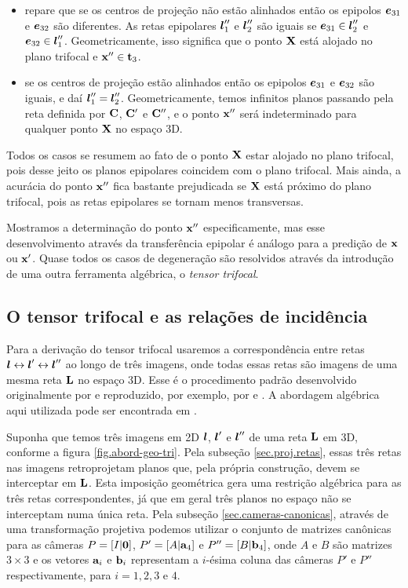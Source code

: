 \begin{itemize}
\item repare que se os centros de projeção não estão alinhados então os epipolos $\boldsymbol{e}_{31}$ e $\boldsymbol{e}_{32}$ são diferentes. As retas epipolares $\boldsymbol{l}''_1$ e $\boldsymbol{l}''_2$ são iguais se $\boldsymbol{e}_{31}\in\boldsymbol{l}''_2$ e $\boldsymbol{e}_{32}\in\boldsymbol{l}''_1$. Geometricamente, isso significa que o ponto $\mathbf{X}$ está alojado no plano trifocal e $\mathbf{x}''\in{\bf t}_3$.

\item se os centros de projeção estão alinhados então os epipolos $\boldsymbol{e}_{31}$ e $\boldsymbol{e}_{32}$ são iguais, e daí $\boldsymbol{l}''_1=\boldsymbol{l}''_2$. Geometricamente, temos infinitos planos passando pela reta definida por ${\bf C}$, ${\bf C}'$ e ${\bf C}''$, e o ponto $\mathbf{x}''$ será indeterminado para qualquer ponto $\mathbf{X}$ no espaço 3D.
\end{itemize}

Todos os casos se resumem ao fato de o ponto $\mathbf{X}$ estar alojado no plano trifocal, pois desse jeito os planos epipolares coincidem com o plano trifocal. Mais ainda, a acurácia do ponto $\mathbf{x}''$ fica bastante prejudicada se $\mathbf{X}$ está próximo do plano trifocal, pois as retas epipolares se tornam menos transversas. 

Mostramos a determinação do ponto $\mathbf{x}''$ especificamente, mas esse desenvolvimento através da transferência epipolar é análogo para a predição de $\mathbf{x}$ ou $\mathbf{x}'$. Quase todos os casos de degeneração são resolvidos através da introdução de uma outra ferramenta algébrica, o {\it tensor trifocal}.

\subsection{O tensor trifocal e as relações de incidência}\label{sec.tensor-tri-rela-inci}

Para a derivação do tensor trifocal usaremos a correspondência entre retas $\boldsymbol{l}\leftrightarrow\boldsymbol{l}'\leftrightarrow\boldsymbol{l}''$ ao longo de três imagens, onde todas essas retas são imagens de uma mesma reta $\bf L$ no espaço 3D. Esse é o procedimento padrão desenvolvido originalmente por 
\citep{original-trifocal-retas} e reproduzido, por exemplo, por  \citep{Faugeras} e \citep{forsyth}. A abordagem algébrica aqui utilizada pode ser encontrada em \citep{Hartley2004}.

Suponha que temos três imagens em 2D $\boldsymbol{l}$, $\boldsymbol{l}'$ e $\boldsymbol{l}''$  de uma reta ${\bf L}$ em 3D, conforme a figura \ref{fig.abord-geo-tri}. Pela subseção \ref{sec.proj.retas}, essas três retas nas imagens retroprojetam planos que, pela própria construção, devem se interceptar em ${\bf L}$. Esta imposição geométrica gera uma restrição algébrica para as três retas correspondentes, já que em geral três planos no espaço não se interceptam numa única reta. Pela subseção \ref{sec.cameras-canonicas}, através de uma transformação projetiva podemos utilizar o conjunto de matrizes canônicas para as câmeras $P=[I|{\bf 0}]$, $P'=[A|{\bf a}_4]$ e $P''=[B|{\bf b}_4]$, onde $A$ e $B$ são matrizes $3\times3$ e os vetores ${\bf a}_i$ e ${\bf b}_i$ representam a $i$-ésima coluna das câmeras $P'$ e $P''$ respectivamente, para $i=1,2,3 \,\,\text{e}\,\, 4$.

